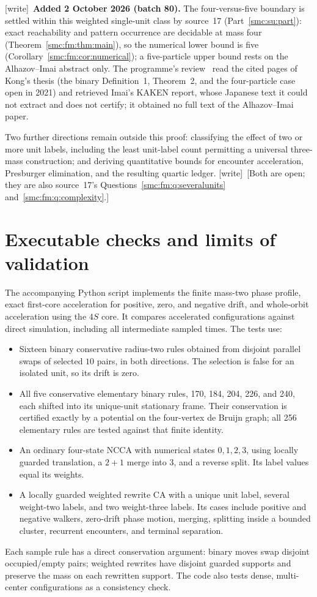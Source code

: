 \documentclass[11pt,letterpaper]{article}
\numberwithin{equation}{section}
\theoremstyle{definition}
\theoremstyle{remark}
\newcommand{\wtag}{\textup{[write]}}
\begin{document}
\wtag\ \textbf{Added 2 October 2026 (batch 80).} The four-versus-five boundary is settled within this weighted single-unit class by source~17 (Part~\ref{smc:su:part}): exact reachability and pattern occurrence are decidable at mass four (Theorem~\ref{smc:fm:thm:main}), so the numerical lower bound is five (Corollary~\ref{smc:fm:cor:numerical}); a five-particle upper bound rests on the Alhazov--Imai abstract only. The programme's review~\cite{reviewlowmass} read the cited pages of Kong's thesis (the binary Definition~1, Theorem~2, and the four-particle case open in 2021) and retrieved Imai's KAKEN report, whose Japanese text it could not extract and does not certify; it obtained no full text of the Alhazov--Imai paper.

Two further directions remain outside this proof: classifying the effect of two
or more unit labels, including the least unit-label count permitting a universal
three-mass construction; and deriving quantitative bounds for encounter
acceleration, Presburger elimination, and the resulting quartic ledger. \wtag\ [Both are open; they are also source~17's Questions~\ref{smc:fm:q:severalunits} and~\ref{smc:fm:q:complexity}.]

\section{Executable checks and limits of validation}\label{smc:su:sec:checks}

The accompanying Python script implements the finite mass-two phase profile,
exact first-core acceleration for positive, zero, and negative drift, and
whole-orbit acceleration using the $4S$ core. It compares accelerated
configurations against direct simulation, including all intermediate sampled
times. The tests use:
\begin{itemize}
\item Sixteen binary conservative radius-two rules obtained from disjoint
parallel swaps of selected $10$ pairs, in both directions. The selection is
false for an isolated unit, so its drift is zero.
\item All five conservative elementary binary rules, 170, 184, 204, 226,
and 240, each shifted into its unique-unit stationary frame. Their conservation
is certified exactly by a potential on the four-vertex de Bruijn graph; all 256
elementary rules are tested against that finite identity.
\item An ordinary four-state NCCA with numerical states $0,1,2,3$, using
locally guarded translation, a $2+1$ merge into $3$, and a reverse split.
Its label values equal its weights.
\item A locally guarded weighted rewrite CA with a unique unit label,
several weight-two labels, and two weight-three labels. Its cases include
positive and negative walkers, zero-drift phase motion, merging, splitting
inside a bounded cluster, recurrent encounters, and terminal separation.
\end{itemize}
Each sample rule has a direct conservation argument: binary moves swap
disjoint occupied/empty pairs; weighted rewrites have disjoint guarded supports
and preserve the mass on each rewritten support. The code also tests dense,
multi-center configurations as a consistency check.
\end{document}
